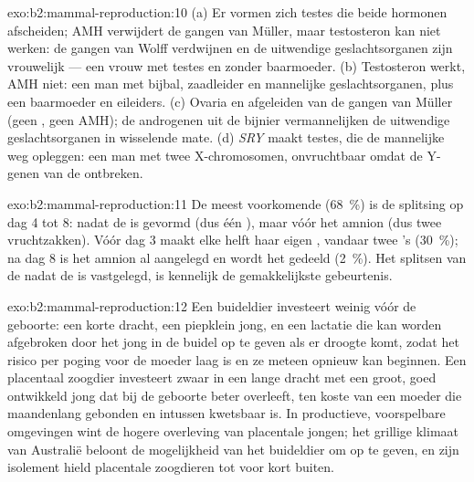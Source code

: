 \begin{solution}{exo:b2:mammal-reproduction:10}
(a) Er vormen zich testes die beide hormonen afscheiden; AMH verwijdert de
gangen van Müller, maar testosteron kan niet werken: de gangen van Wolff
verdwijnen en de uitwendige geslachtsorganen zijn vrouwelijk --- een vrouw
met testes en zonder baarmoeder. (b) Testosteron werkt, AMH niet: een man
met bijbal, zaadleider en mannelijke geslachtsorganen, plus een baarmoeder
en eileiders. (c) Ovaria en afgeleiden van de gangen van Müller (geen
, geen AMH); de androgenen uit de bijnier vermannelijken de
uitwendige geslachtsorganen in wisselende mate. (d)
\emph{SRY} maakt testes, die de mannelijke weg opleggen: een man met twee
X-chromosomen, onvruchtbaar omdat de Y-genen van de 
ontbreken.
\end{solution}

\begin{solution}{exo:b2:mammal-reproduction:11}
De meest voorkomende (\qty{68}{\%}) is de splitsing op dag 4 tot 8: nadat
de  is gevormd (dus één ), maar vóór het amnion (dus twee
vruchtzakken). Vóór dag 3 maakt elke helft haar eigen , vandaar
twee 's (\qty{30}{\%}); na dag 8 is het amnion al aangelegd en
wordt het gedeeld (\qty{2}{\%}). Het splitsen van de 
nadat de  is vastgelegd, is kennelijk de gemakkelijkste
gebeurtenis.
\end{solution}

\begin{solution}{exo:b2:mammal-reproduction:12}
Een buideldier investeert weinig vóór de geboorte: een korte dracht, een
piepklein jong, en een lactatie die kan worden afgebroken door het jong in
de buidel op te geven als er droogte komt, zodat het risico per poging
voor de moeder laag is en ze meteen opnieuw kan beginnen. Een placentaal
zoogdier investeert zwaar in een lange dracht met een groot, goed
ontwikkeld jong dat bij de geboorte beter overleeft, ten koste van een
moeder die maandenlang gebonden en intussen kwetsbaar is. In productieve,
voorspelbare omgevingen wint de hogere overleving van placentale jongen;
het grillige klimaat van Australië beloont de mogelijkheid van het
buideldier om op te geven, en zijn isolement hield placentale zoogdieren
tot voor kort buiten.
\end{solution}

